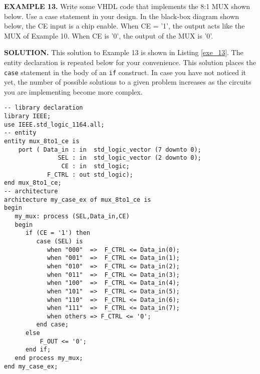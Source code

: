\begin{leftbar}
\begin{minipage}{0.5\linewidth}
\noindent
\textbf{EXAMPLE 13.}
Write some VHDL code that implements the 8:1 MUX shown below. Use a case statement in your design. In the black-box diagram shown below, the CE input is a chip enable. When CE = '1', the output acts like the MUX of Example 10. When CE is '0', the output of the MUX is '0'.
\end{minipage}
\begin{minipage}{0.47\linewidth}
\begin{flushright}
\end{flushright}
\end{minipage}
\end{leftbar}
\noindent
\textbf{SOLUTION.} This solution to Example 13 is shown in Listing \ref{exe_13}. The entity declaration is repeated below for your convenience. This solution places the \texttt{case} statement in the body of an \texttt{if} construct. In case you have not noticed it yet, the number of possible solutions to a given problem increases as the circuits you are implementing become more complex.

\noindent
\begin{minipage}{0.99\linewidth}
\begin{lstlisting}[label=exe_13, caption=Solution to Example 13.]
-- library declaration
library IEEE;
use IEEE.std_logic_1164.all;
-- entity
entity mux_8to1_ce is
    port ( Data_in : in  std_logic_vector (7 downto 0);
               SEL : in  std_logic_vector (2 downto 0);
                CE : in  std_logic;
            F_CTRL : out std_logic);  
end mux_8to1_ce;
-- architecture
architecture my_case_ex of mux_8to1_ce is 
begin
   my_mux: process (SEL,Data_in,CE)
   begin
      if (CE = '1') then 
         case (SEL) is 
            when "000"  =>  F_CTRL <= Data_in(0); 
            when "001"  =>  F_CTRL <= Data_in(1); 
            when "010"  =>  F_CTRL <= Data_in(2); 
            when "011"  =>  F_CTRL <= Data_in(3); 
            when "100"  =>  F_CTRL <= Data_in(4); 
            when "101"  =>  F_CTRL <= Data_in(5); 
            when "110"  =>  F_CTRL <= Data_in(6); 
            when "111"  =>  F_CTRL <= Data_in(7); 
            when others => F_CTRL <= '0'; 
         end case; 
      else
          F_OUT <= '0'; 
      end if; 
   end process my_mux; 
end my_case_ex;
\end{lstlisting}
\end{minipage}

